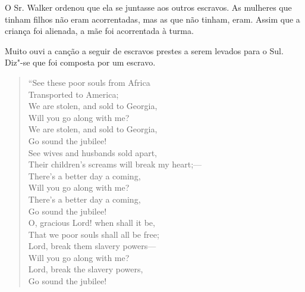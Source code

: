 O Sr. Walker ordenou que ela se juntasse aos outros escravos. As
mulheres que tinham filhos não eram acorrentadas, mas as que não tinham,
eram. Assim que a criança foi alienada, a mãe foi acorrentada à turma.

Muito ouvi a canção a seguir de escravos prestes a serem levados para o
Sul. Diz"-se que foi composta por um escravo.

\pagebreak

\begin{verse}
``See these poor souls from Africa\\
Transported to America;\\
We are stolen, and sold to Georgia,\\
Will you go along with me?\\
We are stolen, and sold to Georgia,\\
Go sound the jubilee!\\[5pt]

See wives and husbands sold apart,\\
Their children's screams will break my \qb{}heart;---\\
There's a better day a coming,\\
Will you go along with me?\\
There's a better day a coming,\\
Go sound the jubilee!\\[5pt]

O, gracious Lord! when shall it be,\\
That we poor souls shall all be free;\\
Lord, break them slavery powers---\\
Will you go along with me?\\
Lord, break the slavery powers,\\
Go sound the jubilee!\\[5pt]


\end{verse}
